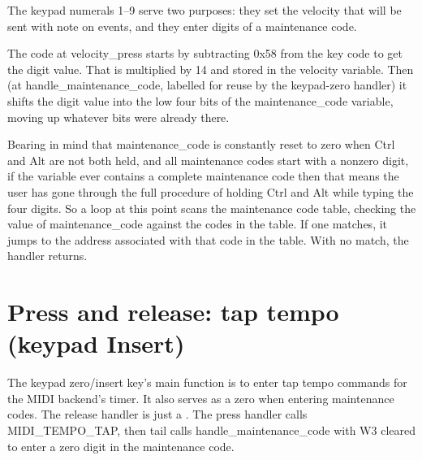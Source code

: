 The keypad numerals 1--9 serve two purposes:  they set the velocity that
will be sent with note on events, and they enter digits of a maintenance
code.

The code at velocity\_press starts by subtracting 0x58 from the key code to
get the digit value.  That is multiplied by 14
and stored in the velocity variable.  Then (at
handle\_maintenance\_code, labelled for reuse by the keypad-zero handler) it
shifts the digit value into the low four bits of the maintenance\_code
variable, moving up whatever bits were already there.

Bearing in mind that maintenance\_code is constantly reset to zero when Ctrl
and Alt are not both held, and all maintenance codes start with a nonzero
digit, if the variable ever contains a complete maintenance code then that
means the user has gone through the full procedure of holding Ctrl and Alt
while typing the four digits.  So a loop at this point scans the maintenance
code table, checking the value of maintenance\_code against the codes in the
table.  If one matches, it jumps to the address associated with that code in
the table.  With no match, the handler returns.

\section{Press and release:  tap tempo (keypad Insert)}

The keypad zero/insert key's main function is to enter tap tempo commands
for the MIDI backend's timer.  It also serves as a zero when entering
maintenance codes.  The release handler is just a .  The press
handler calls MIDI\_TEMPO\_TAP, then tail calls handle\_maintenance\_code
with W3 cleared to enter a zero digit in the maintenance code.
